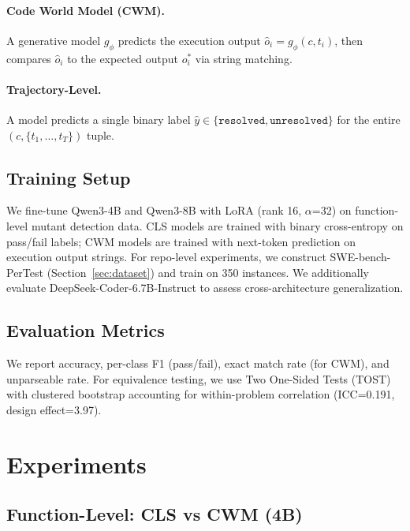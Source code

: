 \documentclass[11pt,a4paper]{article}
\begin{document}
\paragraph{Code World Model (CWM).} A generative model $g_\phi$ predicts the execution output $\hat{o}_i = g_\phi(c, t_i)$, then compares $\hat{o}_i$ to the expected output $o_i^*$ via string matching.

\paragraph{Trajectory-Level.} A model predicts a single binary label $\hat{y} \in \{\texttt{resolved}, \texttt{unresolved}\}$ for the entire $(c, \{t_1, \ldots, t_T\})$ tuple.

\subsection{Training Setup}

We fine-tune Qwen3-4B and Qwen3-8B with LoRA (rank 16, $\alpha$=32) on function-level mutant detection data. CLS models are trained with binary cross-entropy on pass/fail labels; CWM models are trained with next-token prediction on execution output strings. For repo-level experiments, we construct SWE-bench-PerTest (Section~\ref{sec:dataset}) and train on 350 instances. We additionally evaluate DeepSeek-Coder-6.7B-Instruct to assess cross-architecture generalization.

\subsection{Evaluation Metrics}

We report accuracy, per-class F1 (pass/fail), exact match rate (for CWM), and unparseable rate. For equivalence testing, we use Two One-Sided Tests (TOST) with clustered bootstrap accounting for within-problem correlation (ICC=0.191, design effect=3.97).

\section{Experiments}

\subsection{Function-Level: CLS vs CWM (4B)}
\label{sec:func4b}
\end{document}
